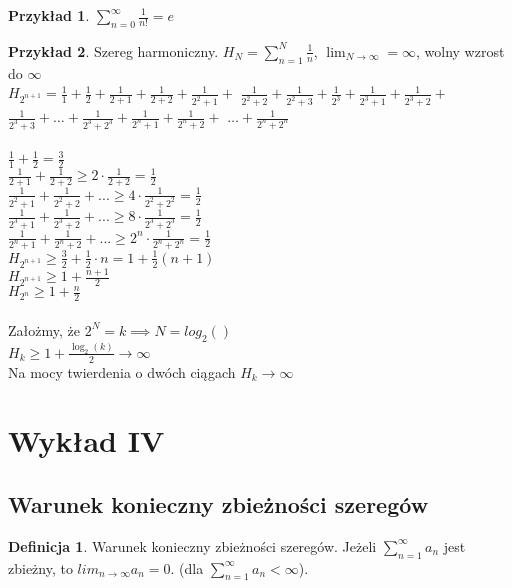 \documentclass{article}
\theoremstyle{definition}
\newtheorem{de}{Definicja}[subsection]
\theoremstyle{definition}
\theoremstyle{definition}
\newtheorem{pk}{Przykład}[subsection]
\theoremstyle{definition}
\begin{document}
\begin{pk}
    $\sum_{n=0}^{\infty} \frac{1}{n!} = e$
\end{pk}

\begin{pk}
Szereg harmoniczny.
$H_N = \sum_{n=1}^{N} \frac{1}{n}$, $\lim_{N\rightarrow \infty}=\infty$, wolny wzrost do $\infty$\\
$H_{2^{n+1}}=\frac{1}{1} + \frac{1}{2} + \frac{1}{2+1} + \frac{1}{2+2} + \frac{1}{2^2 + 1} +$
$\frac{1}{2^2+2} + \frac{1}{2^2+3} + \frac{1}{2^3} + \frac{1}{2^3+1} + \frac{1}{2^3 + 2} +$
$\frac{1}{2^3 + 3} + \dots + \frac{1}{2^3 + 2^3} + \frac{1}{2^n + 1} + \frac{1}{2^n + 2} +$
$\dots + \frac{1}{2^n+2^n}$\\\\
$\frac{1}{1}+\frac{1}{2}=\frac{3}{2}$\\
$\frac{1}{2+1}+\frac{1}{2+2}\geq 2\cdot \frac{1}{2+2}=\frac{1}{2}$\\
$\frac{1}{2^2+1}+\frac{1}{2^2+2} + ... \geq 4\cdot \frac{1}{2^2 + 2^2}=\frac{1}{2}$\\
$\frac{1}{2^3+1}+\frac{1}{2^3+2} + ... \geq 8\cdot \frac{1}{2^3 + 2^3}=\frac{1}{2}$\\
$\frac{1}{2^n+1}+\frac{1}{2^n+2} + ... \geq 2^{n}\cdot \frac{1}{2^n + 2^n}=\frac{1}{2}$\\
$H_{2^{n+1}}\geq \frac{3}{2} + \frac{1}{2} \cdot n = 1 + \frac{1}{2} (n+1)$\\
$H_{2^{n+1}}\geq 1 + \frac{n+1}{2}$\\
$H_{2^n}\geq 1 + \frac{n}{2}$\\\\
Założmy, że $2^N=k \implies N=log_2()$\\
$H_{k}\geq 1 + \frac{\log_2(k)}{2} \rightarrow \infty$\\
Na mocy twierdenia o dwóch ciągach $H_k \rightarrow \infty$
\end{pk}

\section{Wykład IV}

\subsection{Warunek konieczny zbieżności szeregów}

\begin{de}
    Warunek konieczny zbieżności szeregów. Jeżeli $\sum_{n=1}^{\infty} a_n$ jest zbieżny, to $lim_{n\rightarrow \infty} a_n = 0$. (dla $\sum_{n=1}^{\infty} a_n < \infty$).
\end{de}
\end{document}

